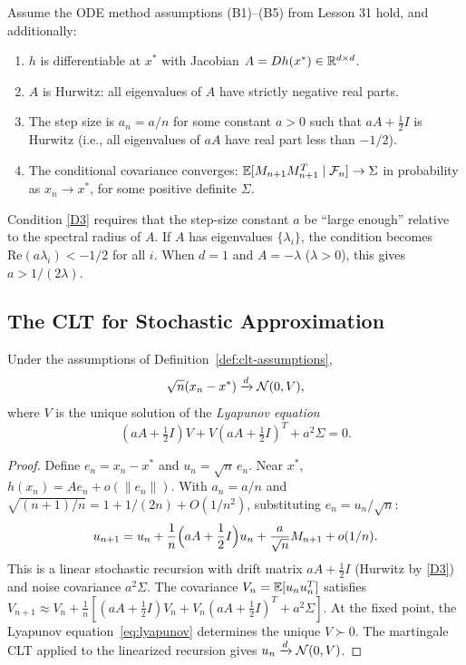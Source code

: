 \documentclass[11pt,a4paper]{article}
\begin{document}
\begin{definition}
\label{def:clt-assumptions}
Assume the ODE method assumptions (B1)--(B5) from Lesson 31 hold,
and additionally:
\begin{enumerate}[label=(D\arabic*)]
  \item \label{D1} $h$ is differentiable at $x^*$ with Jacobian
    $A = Dh(x^*) \in \mathbb{R}^{d \times d}$.
  \item \label{D2} $A$ is Hurwitz: all eigenvalues of $A$ have
    strictly negative real parts.
  \item \label{D3} The step size is $a_n = a/n$ for some constant
    $a > 0$ such that $aA + \frac{1}{2}I$ is Hurwitz (i.e., all
    eigenvalues of $aA$ have real part less than $-1/2$).
  \item \label{D4} The conditional covariance converges:
    $\mathbb{E}[M_{n+1} M_{n+1}^T \mid \mathcal{F}_n] \to \Sigma$ in
    probability as $x_n \to x^*$, for some positive definite
    $\Sigma$.
\end{enumerate}
\end{definition}

\begin{remark}
Condition \ref{D3} requires that the step-size constant $a$ be
``large enough'' relative to the spectral radius of $A$. If $A$ has
eigenvalues $\{\lambda_i\}$, the condition becomes
$\mathrm{Re}(a\lambda_i) < -1/2$ for all $i$. When $d = 1$ and
$A = -\lambda$ ($\lambda > 0$), this gives $a > 1/(2\lambda)$.
\end{remark}

\subsection{The CLT for Stochastic Approximation}

\begin{theorem}
\label{thm:sa-clt}
Under the assumptions of Definition~\ref{def:clt-assumptions},
\[
  \sqrt{n}(x_n - x^*) \xrightarrow{d} \mathcal{N}(0, V),
\]
where $V$ is the unique solution of the \emph{Lyapunov equation}
\begin{equation}
\label{eq:lyapunov}
  (aA + \tfrac{1}{2}I) V + V(aA + \tfrac{1}{2}I)^T
    + a^2 \Sigma = 0.
\end{equation}
\end{theorem}

\begin{proof}
Define $e_n = x_n - x^*$ and $u_n = \sqrt{n}\,e_n$. Near $x^*$,
$h(x_n) = Ae_n + o(\|e_n\|)$. With $a_n = a/n$ and
$\sqrt{(n+1)/n} = 1 + 1/(2n) + O(1/n^2)$, substituting
$e_n = u_n/\sqrt{n}$:
\[
  u_{n+1} = u_n + \frac{1}{n}\Bigl(aA + \frac{1}{2}I\Bigr)u_n
    + \frac{a}{\sqrt{n}}M_{n+1} + o(1/n).
\]
This is a linear stochastic recursion with drift matrix
$aA + \frac{1}{2}I$ (Hurwitz by \ref{D3}) and noise covariance
$a^2\Sigma$. The covariance $V_n = \mathbb{E}[u_nu_n^T]$ satisfies
$V_{n+1} \approx V_n + \frac{1}{n}[(aA+\frac{1}{2}I)V_n +
V_n(aA+\frac{1}{2}I)^T + a^2\Sigma]$.
At the fixed point, the Lyapunov equation~\eqref{eq:lyapunov}
determines the unique $V \succ 0$. The martingale CLT applied to
the linearized recursion gives $u_n \xrightarrow{d} \mathcal{N}(0,V)$.
\end{proof}
\end{document}
